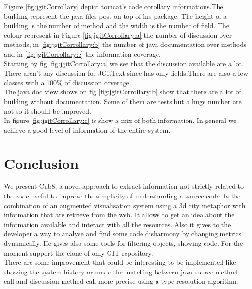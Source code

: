 \documentclass[]{usiinfbachelorproject}
\begin{document}
Figure \ref{fig:jgitCorrollary} depict tomcat's code corollary  informations.The building represent the java files post on top of his package. The height of a building is the number of method and the width is the number of field. The colour represent in Figure \ref{fig:jgitCorrollary:a} the number of discussion over methods, in \ref{fig:jgitCorrollary:b} the number of java documentation over methods and  in \ref{fig:jgitCorrollary:c} the information coverage.\\
Starting by fig \ref{fig:jgitCorrollary:a} we see that the discussion available are a lot. There aren't any discussion for JGitText since has only fields.There are also a few classes with a 100\% of discussion coverage.\\
The java doc view shows on fig \ref{fig:jgitCorrollary:b} show that there are a lot of building without documentation. Some of them are tests,but a huge number are not so it should be improved.\\

In figure  \ref{fig:jgitCorrollary:c} is show a mix of both information. In general we achieve a good level of information of the entire system.  

\newpage
\section{Conclusion} \label{conclusion}
We present Cub8, a novel approach to extract information not strictly related to the code useful to improve the simplicity of understanding a source code. Is the combination of an augmented visualisation system using a 3d city metaphor with information that are retrieve from the web. It allows to get  an idea about the information available and interact with all the resources. Also it gives to the developer a way to analyse and find some code disharmony by changing metrics dynamically. He gives also some tools for filtering objects, showing code. For the moment support the clone of only GIT repository. \\
There are some improvement that could be interesting to be implemented like showing the system history or made the matching between java source method call and discussion method call more precise using a type resolution algorithm.\\
  
  



\end{document}
